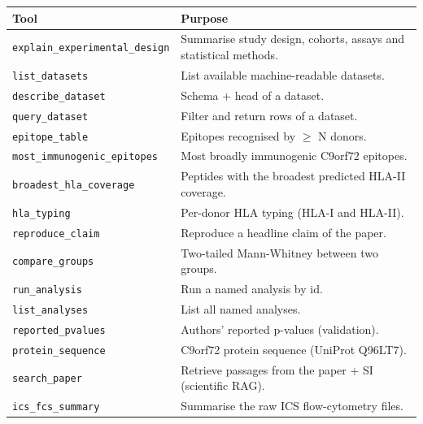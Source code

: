 \begin{tabular}{p{4.6cm}p{9.0cm}}
\toprule
Tool & Purpose \\
\midrule
\texttt{explain\_experimental\_design} & Summarise study design, cohorts, assays and statistical methods. \\
\texttt{list\_datasets} & List available machine-readable datasets. \\
\texttt{describe\_dataset} & Schema + head of a dataset. \\
\texttt{query\_dataset} & Filter and return rows of a dataset. \\
\texttt{epitope\_table} & Epitopes recognised by $\geq$ N donors. \\
\texttt{most\_immunogenic\_epitopes} & Most broadly immunogenic C9orf72 epitopes. \\
\texttt{broadest\_hla\_coverage} & Peptides with the broadest predicted HLA-II coverage. \\
\texttt{hla\_typing} & Per-donor HLA typing (HLA-I and HLA-II). \\
\texttt{reproduce\_claim} & Reproduce a headline claim of the paper. \\
\texttt{compare\_groups} & Two-tailed Mann-Whitney between two groups. \\
\texttt{run\_analysis} & Run a named analysis by id. \\
\texttt{list\_analyses} & List all named analyses. \\
\texttt{reported\_pvalues} & Authors' reported p-values (validation). \\
\texttt{protein\_sequence} & C9orf72 protein sequence (UniProt Q96LT7). \\
\texttt{search\_paper} & Retrieve passages from the paper + SI (scientific RAG). \\
\texttt{ics\_fcs\_summary} & Summarise the raw ICS flow-cytometry files. \\
\bottomrule
\end{tabular}
